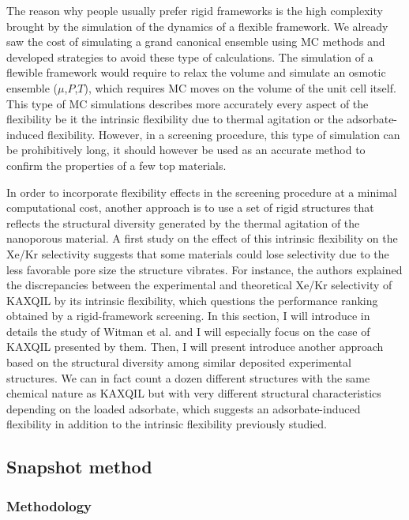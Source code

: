 \documentclass[main]{subfiles}
\begin{document}
The reason why people usually prefer rigid frameworks is the high complexity brought by the simulation of the dynamics of a flexible framework. We already saw the cost of simulating a grand canonical ensemble using MC methods and developed strategies to avoid these type of calculations. The simulation of a flewible framework would require to relax the volume and simulate an osmotic ensemble ($\mu$,$P$,$T$), which requires MC moves on the volume of the unit cell itself.\autocite{Bousquet2012} This type of MC simulations describes more accurately every aspect of the flexibility be it the intrinsic flexibility due to thermal agitation or the adsorbate-induced flexibility. However, in a screening procedure, this type of simulation can be prohibitively long, it should however be used as an accurate method to confirm the properties of a few top materials. 

In order to incorporate flexibility effects in the screening procedure at a minimal computational cost, another approach is to use a set of rigid structures that reflects the structural diversity generated by the thermal agitation of the nanoporous material. A first study on the effect of this intrinsic flexibility on the Xe/Kr selectivity suggests that some materials could lose selectivity due to the less favorable pore size the structure vibrates.\autocite{Witman_2017} For instance, the authors explained the discrepancies between the experimental and theoretical Xe/Kr selectivity of KAXQIL\autocite{KAXQIL} by its intrinsic flexibility, which questions the performance ranking obtained by a rigid-framework screening. In this section, I will introduce in details the study of Witman et al.\autocite{Witman_2017} and I will especially focus on the case of KAXQIL presented by them. Then, I will present introduce another approach based on the structural diversity among similar deposited experimental structures. We can in fact count a dozen different structures with the same chemical nature as KAXQIL but with very different structural characteristics depending on the loaded adsorbate, which suggests an adsorbate-induced flexibility in addition to the intrinsic flexibility previously studied. 

\subsection{Snapshot method}

\subsubsection{Methodology}
\end{document}

